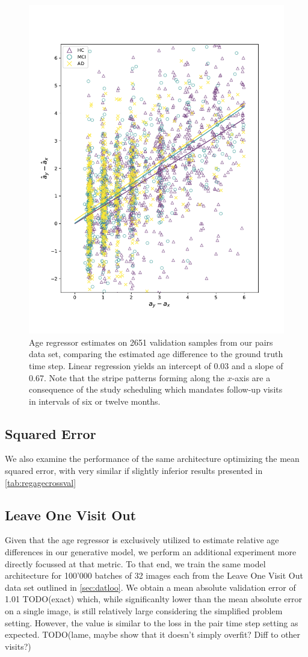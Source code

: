 \begin{figure}
	\centering
	\includegraphics[width=.7\linewidth]{images/age_plots/d_dhat_real}
	\vspace*{-15pt}
	\caption{Age regressor estimates on 2651 validation samples from our pairs data set, comparing the estimated age difference to the ground truth time step. Linear regression yields an intercept of 0.03 and a slope of 0.67. Note that the stripe patterns forming along the $x$-axis are a consequence of the study scheduling which mandates follow-up visits in intervals of six or twelve months.}
	\label{fig:regddhatreal}
\end{figure}

\subsection*{Squared Error}
We also examine the performance of the same architecture optimizing the mean squared error, with very similar if slightly inferior results presented in \autoref{tab:regagecrossval}

\subsection*{Leave One Visit Out}
Given that the age regressor is exclusively utilized to estimate relative age differences in our generative model, we perform an additional experiment more directly focussed at that metric. To that end, we train the same model architecture for 100'000 batches of 32 images each from the Leave One Visit Out data set outlined in \autoref{sec:datloo}. We obtain a mean absolute validation error of 1.01 TODO(exact) which, while significanlty lower than the mean absolute error on a single image, is still relatively large considering the simplified problem setting. However, the value is similar to the loss in the pair time step setting as expected. TODO(lame, maybe show that it doesn't simply overfit? Diff to other visits?)


